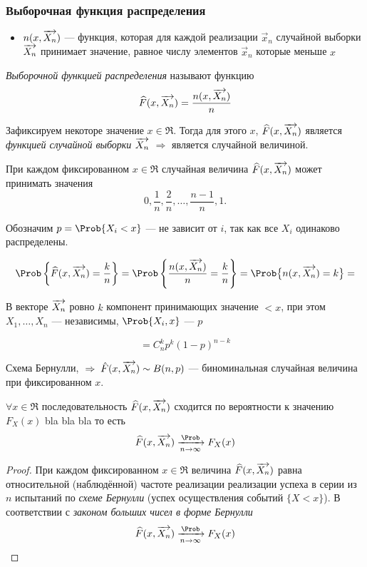 \subsubsection{Выборочная функция распределения}

\begin{itemize}
	\item $n(x, \overrightarrow{X_n})$ --- функция, которая для каждой реализации $\vec{x}_n$ случайной выборки $\overrightarrow{X_n}$ принимает значение, равное числу элементов $\vec{x}_n$ которые меньше $x$
\end{itemize}

\begin{defn}
	\emph{Выборочной функцией распределения} называют функцию
	\begin{equation}
		\widehat{F}(x, \overrightarrow{X_n}) = \frac{n(x, \overrightarrow{X_n})}{n}
	\end{equation}
\end{defn}
\begin{rem}
	Зафиксируем некоторе значение $x \in \Re$. Тогда для этого $x$, $\widehat{F}(x, \overrightarrow{X_n})$ является \emph{функцией случайной выборки $\overrightarrow{X_n}$} $\Rightarrow$ является случайной величиной.
\end{rem}
\begin{rem}
	При каждом фиксированном $x \in \Re$ случайная величина $\widehat{F}(x, \overrightarrow{X_n})$ может принимать значения
	\[
		0, \frac{1}{n}, \frac{2}{n}, \dots, \frac{n-1}{n}, 1.
	\]
\end{rem}

\noindent
Обозначим $p = \Prob \{ X_i < x \}$ --- не зависит от $i$, так как все $X_i$ одинаково распределены.

\[
	\Prob \left\{ \widehat{F}(x, \vvec{X_n}) = \frac{k}{n} \right\} = \Prob \left\{ \frac{n(x, \vvec{X_n})}{n} = \frac{k}{n} \right\} = \Prob \bigl\{ n(x, \vvec{X_n}) = k \bigr\} = 
\]

\noindent
В векторе $\overrightarrow{X_n}$ ровно $k$ компонент принимающих значение $< x$, при этом $X_1, \dots, X_n$ --- независимы, $\Prob \{ X_i , x \}$ --- $p$ 

\[
	= C_n^k p^k (1 - p)^{n-k}
\]

\noindent
Схема Бернулли, $\;\Rightarrow\; \hat{F}(x, \overrightarrow{X_n}) \sim B(n, p)$ --- биноминальная случайная величина при фиксированном $x$.

\begin{thm}
	$\forall x \in \Re$ последовательность $\widehat{F}(x, \overrightarrow{X_n})$ сходится по вероятности к значению $F_{X}(x)$ bla bla bla то есть
	\begin{equation}
		\widehat{F}(x, \vvec{X_n}) \xrightarrow[n\to\infty]{\Prob} F_{X}(x)
	\end{equation}
\end{thm}
\begin{proof}
	При каждом фиксированном $x \in \Re$ величина $\widehat{F}(x, \overrightarrow{X_n})$ равна относительной (наблюдённой) частоте реализации реализации успеха в серии из $n$ испытаний по \emph{схеме Бернулли} (успех осуществления событий $\{ X < x \}$). В соответствии с \emph{законом больших чисел в форме Бернулли}
	\[
		\widehat{F}(x, \vvec{X_n}) \xrightarrow[n\to\infty]{\Prob} F_{X}(x)
	\]
\end{proof}


